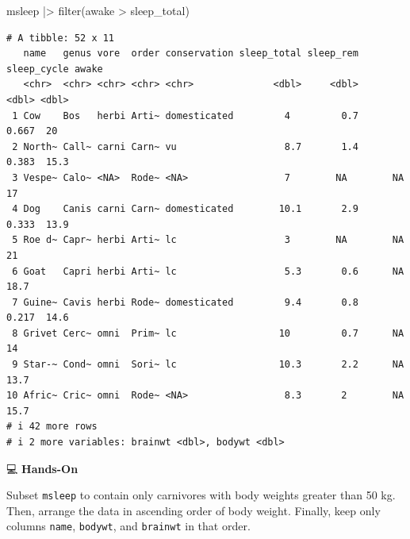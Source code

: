 \documentclass[
  letterpaper,
  DIV=11,
  numbers=noendperiod]{scrreprt}
\newenvironment{Shaded}{\begin{snugshade}}{\end{snugshade}}
\newcommand{\FunctionTok}[1]{\textcolor[rgb]{0.28,0.35,0.67}{#1}}
\newcommand{\NormalTok}[1]{\textcolor[rgb]{0.00,0.23,0.31}{#1}}
\newcommand{\SpecialCharTok}[1]{\textcolor[rgb]{0.37,0.37,0.37}{#1}}
\begin{document}
\begin{tcolorbox}[enhanced jigsaw, colbacktitle=quarto-callout-tip-color!10!white, opacitybacktitle=0.6, breakable, left=2mm, leftrule=.75mm, toprule=.15mm, toptitle=1mm, bottomtitle=1mm, colframe=quarto-callout-tip-color-frame, opacityback=0, coltitle=black, arc=.35mm, titlerule=0mm, colback=white, bottomrule=.15mm, title=\textcolor{quarto-callout-tip-color}{\faLightbulb}\hspace{0.5em}{Answer}, rightrule=.15mm]

\begin{Shaded}
\begin{Highlighting}[]
\NormalTok{msleep }\SpecialCharTok{|\textgreater{}}
  \FunctionTok{filter}\NormalTok{(awake }\SpecialCharTok{\textgreater{}}\NormalTok{ sleep\_total)}
\end{Highlighting}
\end{Shaded}

\begin{verbatim}
# A tibble: 52 x 11
   name   genus vore  order conservation sleep_total sleep_rem sleep_cycle awake
   <chr>  <chr> <chr> <chr> <chr>              <dbl>     <dbl>       <dbl> <dbl>
 1 Cow    Bos   herbi Arti~ domesticated         4         0.7       0.667  20  
 2 North~ Call~ carni Carn~ vu                   8.7       1.4       0.383  15.3
 3 Vespe~ Calo~ <NA>  Rode~ <NA>                 7        NA        NA      17  
 4 Dog    Canis carni Carn~ domesticated        10.1       2.9       0.333  13.9
 5 Roe d~ Capr~ herbi Arti~ lc                   3        NA        NA      21  
 6 Goat   Capri herbi Arti~ lc                   5.3       0.6      NA      18.7
 7 Guine~ Cavis herbi Rode~ domesticated         9.4       0.8       0.217  14.6
 8 Grivet Cerc~ omni  Prim~ lc                  10         0.7      NA      14  
 9 Star-~ Cond~ omni  Sori~ lc                  10.3       2.2      NA      13.7
10 Afric~ Cric~ omni  Rode~ <NA>                 8.3       2        NA      15.7
# i 42 more rows
# i 2 more variables: brainwt <dbl>, bodywt <dbl>
\end{verbatim}

\end{tcolorbox}

💻 \textbf{Hands-On}

Subset \texttt{msleep} to contain only carnivores with body weights
greater than 50 kg. Then, arrange the data in ascending order of body
weight. Finally, keep only columns \texttt{name}, \texttt{bodywt}, and
\texttt{brainwt} in that order.
\end{document}

